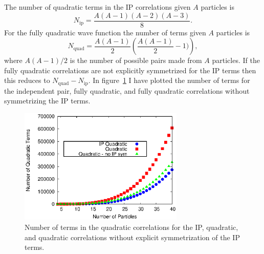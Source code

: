 The number of quadratic terms in the IP correlations given $A$ particles is
\begin{equation}
   N_\text{ip}=\frac{A(A-1)(A-2)(A-3)}{8}.
\end{equation}
For the fully quadratic wave function the number of terms given $A$ particles is
\begin{equation}
   N_\text{quad}=\frac{A(A-1)}{2}\left(\frac{A(A-1)}{2}-1)\right),
\end{equation}
where $A(A-1)/2$ is the number of possible pairs made from $A$ particles. If the fully quadratic correlations are not explicitly symmetrized for the IP terms then this reduces to $N_\text{quad}-N_\text{ip}$. In figure~\ref{fig:scaling_theory} I have plotted the number of terms for the independent pair, fully quadratic, and fully quadratic correlations without symmetrizing the IP terms.
\begin{figure}[h!]
   \centering
   \includegraphics[width=0.7\textwidth]{figures/scaling_theory.eps}
   \caption{Number of terms in the quadratic correlations for the IP, quadratic, and quadratic correlations without explicit symmetrization of the IP terms.}
   \label{fig:scaling_theory}
\end{figure}

